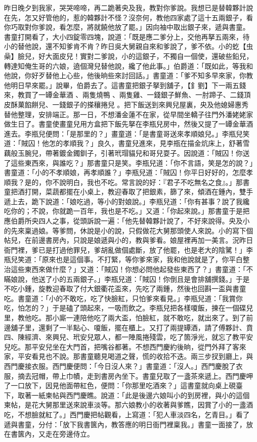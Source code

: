 昨日晚夕到我家，哭哭啼啼，再二跪著央及我，教對你爹說。我想已是替韓夥計說在先，怎又好管他的，惹的韓夥計不怪？沒奈何，教他四家處了這十五兩銀子，看你巧取對你爹說，看怎麼，將就饒他放了罷。」因向袖中取出銀子來，遞與書童。書童打開看了，大小四錠零四塊，說道：「既是應二爹分上，交他再拏五兩來，待小的替他說，還不知爹肯不肯？昨日吳大舅親自來和爹說了，爹不依。小的虼【虫喿】臉兒，好大面皮兒！實對二爹說，小的這銀子，不獨自一個使，還破些鉛兒，轉達知俺生哥的六娘，遶個灣兒替他說，纔了他此事。」伯爵道：「既如此，等我和他說，你好歹替他上心些，他後晌些來討回話。」書童道：「爹不知多早來家，你教他明日早來罷。」說畢，伯爵去了。這書童把銀子拏到舖子，【釒劉】下一兩五錢來，教買了一罈金華酒 、兩隻燒鴨 、兩隻雞、一錢銀子鮮魚、一肘蹄子、二錢頂皮酥菓餡餅兒、一錢銀子的搽穰捲兒 。把下飯送到來興兒屋裏，央及他媳婦惠秀替他整理，安排端正。那一日，不想潘金蓮不在家，從早間坐轎子往門外潘姥姥家做生日了。書童使畫童兒用方盒把下飯先拏在李瓶兒房中，然後又提了一罈金華酒 進去。李瓶兒便問：「是那里的？」畫童道：「是書童哥送來孝順娘兒。」李瓶兒笑道：「賊囚！他怎的孝順我？」良久，書童兒進來，見李瓶在描金炕床上，舒著雪藕般玉腕兒，帶著鍍金鐲釧子，引著玳瑁貓兒和哥兒耍子。因說道：「賊囚！你送了這些東西來，與誰吃？」那書童只是笑。李瓶兒道：「你不言語，笑是怎的說？」書童道：「小的不孝順娘，再孝順誰？」李瓶兒道：「賊囚！你平日好好的，怎麼孝順我？是的，你不說明白，我也不吃。常言說的好：『君子不吃無名之食』。」那書童把酒打開，菜蔬都擺在小桌上，教迎春取了把銀素，篩了來，傾酒在鍾內，雙手遞上去，跪下說道：「娘吃過，等小的對娘說。」李瓶兒道：「你有甚事？說了我纔吃你的；不說，你就跪一百年，我也是不吃。」又道：「你起來說。」那書童于是把應伯爵所央四人之事，從頭訴說一遍：「他先替韓夥計說了，不好來說得。央及小的先來稟過娘。等爹問，休說是小的說，只假做花大舅那頭使人來說。小的寫下個帖兒，在前邊書房內，只說是娘遞與小的，教與爹看。娘屋裡再加一美言。況昨日衙門裡，爹已是打過他罪兒，爹胡亂做個處斷，放了他罷，也是老大的陰騭！」李瓶兒笑道：「原來也是這個事。不打緊，等你爹來家，我和他說就是了，你平白整治這些東西來做什麼？」又道：「賊囚！你想必問他起發些東西了？」書童道：「不瞞娘說，他送了小的五兩銀子。」李瓶兒道：「賊囚！你倒且是會排舖撰錢。」于是不吃小鍾，旋教迎春取了付大銀衢花盃來，先吃了兩鍾，然後也回斟一盃與書童吃。書童道：「小的不敢吃，吃了快臉紅，只怕爹來看見。」李瓶兒道：「我賞你吃，怕怎的？」于是磕了頭起來，一吸而飲之。李瓶兒把各樣嗄飯，揀在一個碟兒里，教他吃。那小廝一連陪他吃了兩大盃，怕臉紅，就不敢吃，就出來了。到了前邊舖子里，還剩了一半點心、嗄飯，擺在櫃上。又打了兩提罈酒，請了傅夥計、賁四、陳經濟、來興兒、玳安兒眾人，都一陣風捲殘雲，吃了箇淨光，就忘了教平安兒吃。那平安兒坐在大門首，把嘴谷都著。不想西門慶約後晌，從門外拜了客來家，平安看見也不說。那書童聽見喝道之聲，慌的收拾不迭。兩三步扠到廳上，與西門慶接衣服。西門慶便問：「今日沒人來？」書童道：「沒人。」西門慶脫了衣服，摘去冠帽，帶上巾幘，走到書房內坐下。書童兒取了一盞茶來遞上。西門慶呷了一口放下，因見他面帶紅色，便問：「你那里吃酒來？」這書童就向桌上硯臺下，取著一紙柬帖與西門慶瞧。說道：「此是後邊六娘叫小的到房裡，與小的這個柬帖，是花大舅那里送來說車淡等。那六娘教小的收著與爹瞧，因賞了小的一盞酒吃，不想臉就紅了。」西門慶把帖觀看，上寫道：「犯人車淡四名，乞青目。」看了遞與書童，分付：「放下我書篋內，教答應的明日衙門裡稟我。」書童一面接了，放在書篋內，又走在旁邊侍立。